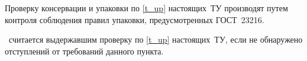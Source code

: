 
Проверку консервации и упаковки по \ref{t_up} настоящих~ТУ производят путем контроля соблюдения правил упаковки, предусмотренных ГОСТ~23216.

\dut \ считается выдержавшим проверку по \ref{t_up} настоящих~ТУ, если не обнаружено отступлений от требований данного пункта.